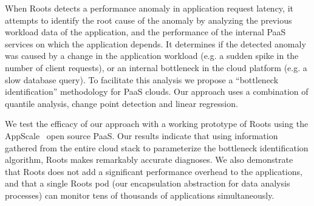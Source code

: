 
When Roots detects a performance anomaly in application request latency, 
it attempts to
identify the root cause of the anomaly by analyzing the previous workload 
data of the application,
and the performance of the internal PaaS services on which the application depends.
It determines if the detected anomaly was caused by a change in the
application workload (e.g. a sudden spike in the number of client requests), or an internal
bottleneck in the cloud platform (e.g. a slow database query). To facilitate
this analysis we propose a ``bottleneck identification'' methodology
for PaaS clouds. 
Our approach uses a combination of quantile analysis, change point detection
and linear regression. 

We test the efficacy of our approach with a working prototype of 
Roots using the AppScale~\cite{6488671} open source PaaS. 
Our results indicate that using information gathered from the entire cloud
stack to parameterize the bottleneck identification algorithm, Roots
makes remarkably accurate diagnoses.
We also demonstrate that Roots does not add a significant performance overhead
to the applications, and that a single Roots pod (our encapsulation abstraction for
data analysis processes) can monitor tens of thousands
of applications simultaneously.

